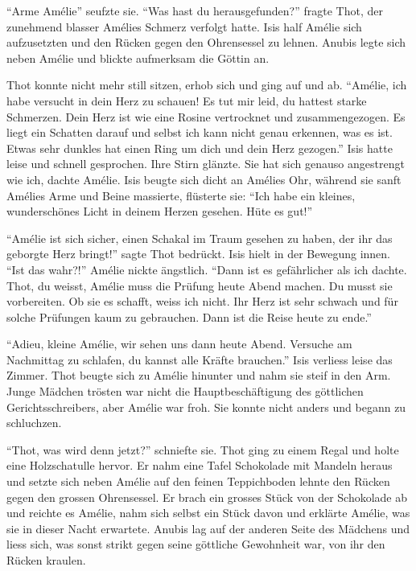 \documentclass[11pt,titlepage,a5paper]{book}
\begin{document}
"`Arme Amélie"' seufzte sie. "`Was hast du herausgefunden?"' fragte Thot, der zunehmend blasser Amélies Schmerz verfolgt hatte. Isis half Amélie sich aufzusetzten und den Rücken gegen den Ohrensessel zu lehnen. Anubis legte sich neben Amélie und blickte aufmerksam die Göttin an. 

Thot konnte nicht mehr still sitzen, erhob sich und ging auf und ab. "`Amélie, ich habe versucht in dein Herz zu schauen! Es tut mir leid, du hattest starke Schmerzen. Dein Herz ist wie eine Rosine vertrocknet und zusammengezogen. Es liegt ein Schatten darauf und selbst ich kann nicht genau erkennen, was es ist. Etwas sehr dunkles hat einen Ring um dich und dein Herz gezogen."' Isis hatte leise und schnell gesprochen. Ihre Stirn glänzte. Sie hat sich genauso angestrengt wie ich, dachte Amélie. Isis beugte sich dicht an Amélies Ohr, während sie sanft Amélies Arme und Beine massierte, flüsterte sie: "`Ich habe ein kleines, wunderschönes Licht in deinem Herzen gesehen. Hüte es gut!"'

"`Amélie ist sich sicher, einen Schakal im Traum gesehen zu haben, der ihr das geborgte Herz bringt!"' sagte Thot bedrückt. Isis hielt in der Bewegung innen. "`Ist das wahr?!"' Amélie nickte ängstlich. "`Dann ist es gefährlicher als ich dachte. Thot, du weisst, Amélie muss die Prüfung heute Abend machen. Du musst sie vorbereiten. Ob sie es schafft, weiss ich nicht. Ihr Herz ist sehr schwach und für solche Prüfungen kaum zu gebrauchen. Dann ist die Reise heute zu ende."'

"`Adieu, kleine Amélie, wir sehen uns dann heute Abend. Versuche am Nachmittag zu schlafen, du kannst alle Kräfte brauchen."' Isis verliess leise das Zimmer. Thot beugte sich zu Amélie hinunter und nahm sie steif in den Arm. Junge Mädchen trösten war nicht die Hauptbeschäftigung des göttlichen Gerichtsschreibers, aber Amélie war froh. Sie konnte nicht anders und begann zu schluchzen.

"`Thot, was wird denn jetzt?"' schniefte sie. Thot ging zu einem Regal und holte eine Holzschatulle hervor. Er nahm eine Tafel Schokolade mit Mandeln heraus und setzte sich neben Amélie auf den feinen Teppichboden lehnte den Rücken gegen den grossen Ohrensessel. Er brach ein grosses Stück von der Schokolade ab und reichte es Amélie, nahm sich selbst ein Stück davon und erklärte Amélie, was sie in dieser Nacht erwartete. Anubis lag auf der anderen Seite des Mädchens und liess sich, was sonst strikt gegen seine göttliche Gewohnheit war, von ihr den Rücken kraulen.
\end{document}
